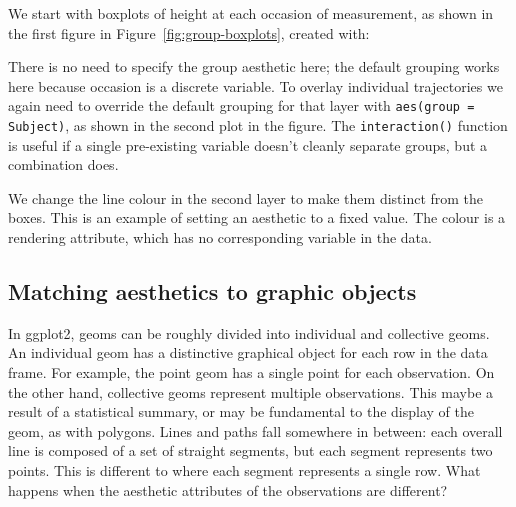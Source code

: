 We start with boxplots of height at each occasion of measurement, as shown in the first figure in Figure~\ref{fig:group-boxplots}, created with:

% 


\noindent There is no need to specify the group aesthetic here; the default grouping works here because occasion is a discrete variable.  To overlay individual trajectories we again need to override the default grouping for that layer with {\tt aes(group = Subject)}, as shown in the second plot in the figure.  The {\tt interaction()} function is useful if a single pre-existing variable doesn't cleanly separate groups, but a combination does.

% 


We change the line colour in the second layer to make them distinct from the boxes.  This is an example of setting an aesthetic to a fixed value.  The colour is a rendering attribute, which has no corresponding variable in the data.

% 


\subsection{Matching aesthetics to graphic objects}
\label{sub:matching}

In ggplot2, geoms can be roughly divided into individual and collective geoms.  An individual geom has a distinctive graphical object for each row in the data frame.  For example, the point geom has a single point for each observation.  On the other hand, collective geoms represent multiple observations.  This maybe a result of a statistical summary, or may be fundamental to the display of the geom, as with polygons.  Lines and paths fall somewhere in between:  each overall line is composed of a set of straight segments, but each segment represents two points.  This is different to  where each segment represents a single row.  What happens when the aesthetic attributes of the observations are different?

